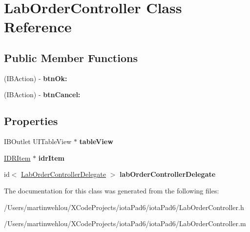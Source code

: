 \hypertarget{interface_lab_order_controller}{
\section{LabOrderController Class Reference}
\label{interface_lab_order_controller}
}
\subsection*{Public Member Functions}
\begin{DoxyCompactItemize}
\item 
\hypertarget{interface_lab_order_controller_a7b6e527309e57adef530bcdb8e8e947c}{
(IBAction) -\/ {\bfseries btnOk:}}
\label{interface_lab_order_controller_a7b6e527309e57adef530bcdb8e8e947c}

\item 
\hypertarget{interface_lab_order_controller_ad6fa19c33889264602290efa28b50b25}{
(IBAction) -\/ {\bfseries btnCancel:}}
\label{interface_lab_order_controller_ad6fa19c33889264602290efa28b50b25}

\end{DoxyCompactItemize}
\subsection*{Properties}
\begin{DoxyCompactItemize}
\item 
\hypertarget{interface_lab_order_controller_a61fb58963f075167b0fb9f44db1a39b8}{
IBOutlet UITableView $\ast$ {\bfseries tableView}}
\label{interface_lab_order_controller_a61fb58963f075167b0fb9f44db1a39b8}

\item 
\hypertarget{interface_lab_order_controller_a002aca69b737b78fbcfc0ac4aea492f8}{
\hyperlink{interface_i_d_r_item}{IDRItem} $\ast$ {\bfseries idrItem}}
\label{interface_lab_order_controller_a002aca69b737b78fbcfc0ac4aea492f8}

\item 
\hypertarget{interface_lab_order_controller_aa1db83d6fad794c073ef3445a7bff3a8}{
id$<$ \hyperlink{protocol_lab_order_controller_delegate-p}{LabOrderControllerDelegate} $>$ {\bfseries labOrderControllerDelegate}}
\label{interface_lab_order_controller_aa1db83d6fad794c073ef3445a7bff3a8}

\end{DoxyCompactItemize}


The documentation for this class was generated from the following files:\begin{DoxyCompactItemize}
\item 
/Users/martinwehlou/XCodeProjects/iotaPad6/iotaPad6/LabOrderController.h\item 
/Users/martinwehlou/XCodeProjects/iotaPad6/iotaPad6/LabOrderController.m\end{DoxyCompactItemize}
